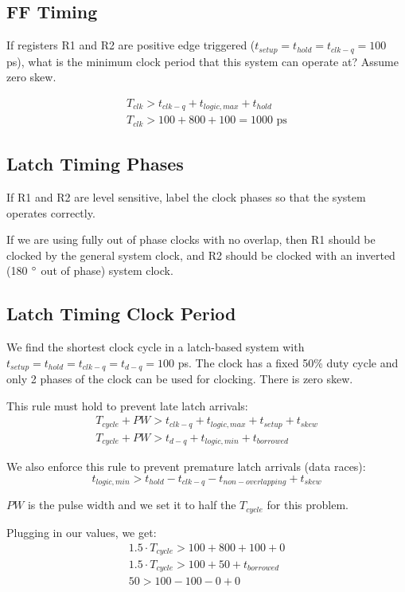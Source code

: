 \documentclass[11pt]{article}
\begin{document}
\subsection{FF Timing}
If registers R1 and R2 are positive edge triggered ($t_{setup} = t_{hold} = t_{clk-q} = 100$ ps), what is the minimum clock period that this system can operate at? Assume zero skew.

\begin{eqnarray}
	T_{clk} > t_{clk-q} + t_{logic,max} + t_{hold} \nonumber \\
	T_{clk} > 100 + 800 + 100 = 1000 \text{ ps} \nonumber
\end{eqnarray}

\subsection{Latch Timing Phases}
If R1 and R2 are level sensitive, label the clock phases so that the system operates correctly.

If we are using fully out of phase clocks with no overlap, then R1 should be clocked by the general system clock, and R2 should be clocked with an inverted (180 $\degree$ out of phase) system clock.

\subsection{Latch Timing Clock Period}
We find the shortest clock cycle in a latch-based system with $t_{setup} = t_{hold} = t_{clk-q} = t_{d-q} = 100$ ps. The clock has a fixed 50\% duty cycle and only 2 phases of the clock can be used for clocking. There is zero skew.

This rule must hold to prevent late latch arrivals:
\begin{eqnarray}
	T_{cycle} + PW > t_{clk-q} + t_{logic,max} + t_{setup} + t_{skew} \\ 
	T_{cycle} + PW > t_{d-q} + t_{logic,min} + t_{borrowed}
\end{eqnarray}

We also enforce this rule to prevent premature latch arrivals (data races):
\begin{equation}
	 t_{logic,min} > t_{hold} - t_{clk-q} - t_{non-overlapping} + t_{skew}
\end{equation}

$PW$ is the pulse width and we set it to half the $T_{cycle}$ for this problem.

Plugging in our values, we get:
\begin{eqnarray}
	1.5 \cdot T_{cycle} > 100 + 800 + 100 + 0 \nonumber \\
	1.5 \cdot T_{cycle} > 100 + 50 + t_{borrowed} \nonumber \\
	50 > 100 - 100 - 0 + 0 \nonumber 
\end{eqnarray}
\end{document}
